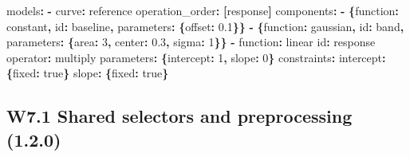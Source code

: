 \documentclass[
  10pt,
  a4paper,
  oneside]{scrreprt}
\newenvironment{Shaded}{}{}
\newcommand{\AttributeTok}[1]{\textcolor[rgb]{0.49,0.56,0.16}{#1}}
\newcommand{\CharTok}[1]{\textcolor[rgb]{0.25,0.44,0.63}{#1}}
\newcommand{\DecValTok}[1]{\textcolor[rgb]{0.25,0.63,0.44}{#1}}
\newcommand{\FloatTok}[1]{\textcolor[rgb]{0.25,0.63,0.44}{#1}}
\newcommand{\FunctionTok}[1]{\textcolor[rgb]{0.02,0.16,0.49}{#1}}
\newcommand{\KeywordTok}[1]{\textcolor[rgb]{0.00,0.44,0.13}{\textbf{#1}}}
\begin{document}
\begin{Shaded}
\begin{Highlighting}[]
\FunctionTok{models}\KeywordTok{:}
\AttributeTok{  }\KeywordTok{{-}}\AttributeTok{ }\FunctionTok{curve}\KeywordTok{:}\AttributeTok{ reference}
\AttributeTok{    }\FunctionTok{operation\_order}\KeywordTok{:}\AttributeTok{ }\KeywordTok{[}\AttributeTok{response}\KeywordTok{]}
\AttributeTok{    }\FunctionTok{components}\KeywordTok{:}
\AttributeTok{      }\KeywordTok{{-}}\AttributeTok{ }\KeywordTok{\{}\FunctionTok{function}\KeywordTok{:}\AttributeTok{ constant}\KeywordTok{,}\AttributeTok{ }\FunctionTok{id}\KeywordTok{:}\AttributeTok{ baseline}\KeywordTok{,}\AttributeTok{ }\FunctionTok{parameters}\KeywordTok{:}\AttributeTok{ }\KeywordTok{\{}\FunctionTok{offset}\KeywordTok{:}\AttributeTok{ }\FloatTok{0.1}\KeywordTok{\}\}}
\AttributeTok{      }\KeywordTok{{-}}\AttributeTok{ }\KeywordTok{\{}\FunctionTok{function}\KeywordTok{:}\AttributeTok{ gaussian}\KeywordTok{,}\AttributeTok{ }\FunctionTok{id}\KeywordTok{:}\AttributeTok{ band}\KeywordTok{,}\AttributeTok{ }\FunctionTok{parameters}\KeywordTok{:}\AttributeTok{ }\KeywordTok{\{}\FunctionTok{area}\KeywordTok{:}\AttributeTok{ }\DecValTok{3}\KeywordTok{,}\AttributeTok{ }\FunctionTok{center}\KeywordTok{:}\AttributeTok{ }\FloatTok{0.3}\KeywordTok{,}\AttributeTok{ }\FunctionTok{sigma}\KeywordTok{:}\AttributeTok{ }\DecValTok{1}\KeywordTok{\}\}}
\AttributeTok{      }\KeywordTok{{-}}\AttributeTok{ }\FunctionTok{function}\KeywordTok{:}\AttributeTok{ linear}
\AttributeTok{        }\FunctionTok{id}\KeywordTok{:}\AttributeTok{ response}
\AttributeTok{        }\FunctionTok{operator}\KeywordTok{:}\AttributeTok{ multiply}
\AttributeTok{        }\FunctionTok{parameters}\KeywordTok{:}\AttributeTok{ }\KeywordTok{\{}\FunctionTok{intercept}\KeywordTok{:}\AttributeTok{ }\DecValTok{1}\KeywordTok{,}\AttributeTok{ }\FunctionTok{slope}\KeywordTok{:}\AttributeTok{ }\DecValTok{0}\KeywordTok{\}}
\AttributeTok{        }\FunctionTok{constraints}\KeywordTok{:}
\AttributeTok{          }\FunctionTok{intercept}\KeywordTok{:}\AttributeTok{ }\KeywordTok{\{}\FunctionTok{fixed}\KeywordTok{:}\AttributeTok{ }\CharTok{true}\KeywordTok{\}}
\AttributeTok{          }\FunctionTok{slope}\KeywordTok{:}\AttributeTok{ }\KeywordTok{\{}\FunctionTok{fixed}\KeywordTok{:}\AttributeTok{ }\CharTok{true}\KeywordTok{\}}
\end{Highlighting}
\end{Shaded}

\hypertarget{w7.1-shared-selectors-and-preprocessing-1.2.0}{%
\subsection{W7.1 Shared selectors and preprocessing
(1.2.0)}\label{w7.1-shared-selectors-and-preprocessing-1.2.0}}
\end{document}
